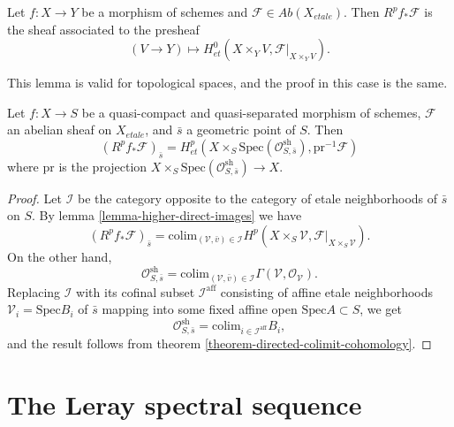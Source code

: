 \begin{lemma}
\label{lemma-higher-direct-images}
Let $f: X\to Y$ be a morphism of schemes and $\mathcal{F}\in
\textit{Ab}(X_{etale})$. Then $R^pf_*\mathcal{F}$ is the sheaf associated to the
presheaf
$$
(V\to Y)\longmapsto H_{et}^0 \left(X\times_Y V,
\mathcal{F}|_{X\times_YV}\right).
$$
\end{lemma}

\noindent
This lemma is valid for topological spaces, and the proof in this case is the
same.

\begin{theorem}
\label{theorem-higher-direct-images}
Let $f: X\to S$ be a quasi-compact and quasi-separated morphism of schemes,
$\mathcal{F}$ an abelian sheaf on $X_{etale}$, and $\bar s$ a geometric point of
$S$. Then
$$
\left(R^pf_* \mathcal{F}\right)_{\bar s} = H_{et}^p\left( X\times_S
\text{Spec}(\mathcal{O}_{S, \bar s}^\mathrm{sh}),
\text{pr}^{-1}\mathcal{F}\right)
$$
where $\text{pr}$ is the projection $X\times_S \text{Spec}(\mathcal{O}_{S,
\bar{s}}^\mathrm{sh}) \to X$.
\end{theorem}

\begin{proof}
Let $\mathcal{I}$ be the category opposite to the category of etale
neighborhoods of $\bar s$ on $S$. By lemma \ref{lemma-higher-direct-images}
we have
$$
\left(R^pf_*\mathcal{F}\right)_{\bar{s}} = \text{colim}_{(\mathcal{V},
\bar{v})\in \mathcal{I}} H^p(X\times_S\mathcal{V},
\mathcal{F}|_{X\times_S\mathcal{V}}).
$$
On the other hand,
$$
\mathcal{O}_{S, \bar{s}}^\mathrm{sh} = \text{colim}_{(\mathcal{V}, \bar v)\in
\mathcal{I}} \Gamma(\mathcal{V}, \mathcal{O}_\mathcal{V}).
$$
Replacing $\mathcal{I}$ with its cofinal subset $\mathcal{I}^\mathrm{aff}$
consisting of affine etale neighborhoods $\mathcal{V}_i= \text{Spec} B_i$ of
$\bar s$ mapping into some fixed affine open $\text{Spec} A \subset S$, we get
$$
\mathcal{O}_{S, \bar{s}}^\mathrm{sh} = \text{colim}_{i\in
\mathcal{I}^\mathrm{aff}} B_i,
$$
and the result follows from theorem \ref{theorem-directed-colimit-cohomology}.
\end{proof}





\section{The Leray spectral sequence}
\label{section-leray}

